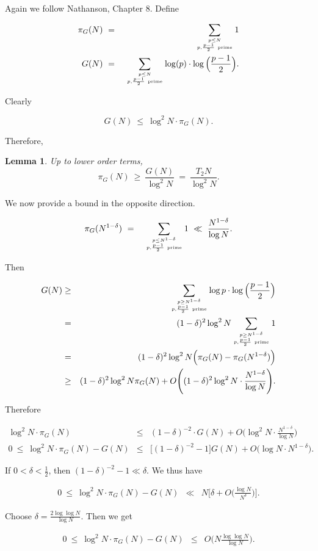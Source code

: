 \documentclass[12pt,letterpaper]{report}
\newcommand\be{\begin{equation}}
\newcommand\ee{\end{equation}}
\newcommand\bea{\begin{eqnarray}}
\newcommand\eea{\end{eqnarray}}
\newcommand{\foh}{\frac{1}{2}}  %
\newtheorem{lem}[thm]{Lemma}
\begin{document}
Again we follow Nathanson, Chapter $8$. Define

\bea \pi_G(N) & \ = \ & \sum_{p \le N \atop p, \frac{p-1}{2} \
\text{prime} } 1 \nonumber\\ G(N) & \ = \ & \sum_{p \le N \atop p,
\frac{p-1}{2} \ \text{prime} } \log(p) \cdot \log\Big(
\frac{p-1}{2} \Big). \eea

Clearly

\be G(N) \ \le \ \log^2 N \cdot \pi_G(N). \ee

Therefore,

\begin{lem} Up to lower order terms,
\be \pi_G(N) \ \ge \ \frac{G(N)}{\log^2 N} \ = \ \frac{T_2
N}{\log^2 N}. \ee
\end{lem}

We now provide a bound in the opposite direction.

\bea \pi_G(N^{1-\delta}) & \ = \ &  \sum_{p \le N^{1-\delta} \atop
p, \frac{p-1}{2} \ \text{prime} } 1 \ \ll \
\frac{N^{1-\delta}}{\log N}. \eea

Then

\bea G(N) &\ge &  \sum_{p \ge N^{1-\delta} \atop p, \frac{p-1}{2}
\ \text{prime} } \log p \cdot \log\Big( \frac{p-1}{2} \Big)
\nonumber\\ &=& (1-\delta)^2 \log^2 N \sum_{p \ge N^{1-\delta}
\atop p, \frac{p-1}{2} \ \text{prime} } 1 \nonumber\\ &=&
(1-\delta)^2 \log^2 N \Big( \pi_G(N) - \pi_G(N^{1-\delta})\Big)
\nonumber\\ &\ge & (1-\delta)^2 \log^2 N \pi_G(N) + O\Bigg(
(1-\delta)^2 \log^2 N \cdot \frac{N^{1-\delta}}{\log N}\Bigg).
\eea

Therefore

\bea \log^2 N \cdot \pi_G(N) & \le & (1-\delta)^{-2} \cdot G(N) +
O\Bigg( \log^2 N \cdot \frac{N^{1-\delta}}{\log N}\Bigg)
\nonumber\\ 0 \ \le \ \log^2 N \cdot \pi_G(N) - G(N) & \le & \Big[
(1 - \delta)^{-2} - 1\Big] G(N) + O\Big(\log N \cdot N^{1 -
\delta} \Big). \eea

If $0 < \delta < \foh$, then $(1 - \delta)^{-2} - 1 \ll \delta$.
We thus have

\bea 0 \ \le \ \log^2 N \cdot \pi_G(N) - G(N) & \ll & N
\Bigg[\delta + O\Big( \frac{\log N}{N^\delta} \Big) \Bigg]. \eea

Choose $\delta = \frac{2 \log \log N}{\log N}$. Then we get

\bea 0 \ \le \ \log^2 N \cdot \pi_G(N) - G(N) & \le & O\Big( N
\frac{\log \log N}{\log N} \Big). \eea
\end{document}
